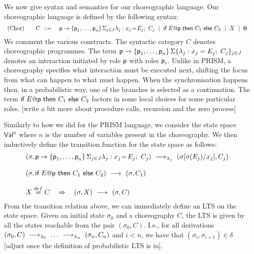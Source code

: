 We now give syntax and semantics for our choreographic language.
%
 Our choreographic language is defined by the following
syntax:
%
\begin{displaymath}
  \begin{array}{lll}
    \text{(Chor)}
    \quad & C \ ::=\
    &
      \textsf{p}\rightarrow \{\textsf{p}_1,\ldots,\textsf{p}_n\}\,\Sigma_{j\in J} \lambda_j: x_j\!=\!E_j;\ C_j
      \ \mid\
      \textsf{if } E@\textsf{p} \textsf{ then } {C_1} \textsf{ else } {C_2}
      \ \mid\
      X
      \ \mid\
      \mathbf{0}
  \end{array}
\end{displaymath}
We comment the various constructs. The syntactic category $C$ denotes
choreographic programmes. The term
$\textsf{p}\rightarrow \{\textsf{p}_1,\ldots,\textsf{p}_n\}\,\Sigma\{\lambda_j:
x_j=E_j;\ C_j\}_{j\in J}$ denotes an interaction initiated by role
$\textsf{p}$ with roles $\textsf{p}_i$. Unlike in PRISM, a choreography
specifies what interaction must be executed next, shifting the focus
from what can happen to what must happen. When the synchronisation
happens then, in a probabilistic way, one of the branches is selected
as a continuation. The term
$\textsf{if } E@\textsf{p} \textsf{ then } C_1 \textsf{
  else } C_2$ factors in some local choices for some particular
roles. [write a bit more about procedure calls, recursion and the zero
process]

\mypar{Semantics.} Similarly to how we did for the PRISM language, we
consider the state space $\mathsf{Val}^n$ where $n$ is the number of
variables present in the choreography. We then inductively define the
transition function for the state space as follows: 
\begin{displaymath}
  \begin{array}{lllll}
    (\sigma, \interact{p}{\role p_1,\ldots,\role p_n}) 
    \red{\lambda_j}
    (\sigma[\sigma(E_j)/x_j], C_j) 
    \\\\
    (\sigma,\ifTE {E}{p}{C_1}{C_2}) 
    \red{}
    (\sigma, C_1)
    \\\\
    X\stackrel{\mathsf{def}}{=} C \quad\Rightarrow\quad (\sigma, X) \red{}(\sigma,C)
  \end{array}
\end{displaymath}
From the transition relation above, we can immediately define an LTS
on the state space. Given an initial state $\sigma_0$ and a
choreography $C$, the LTS is given by all the states reachable from
the pair $(\sigma_0,C)$. I.e., for all derivations
$(\sigma_0,C)\ \longrightarrow_{\lambda_0}\ \ldots\ \longrightarrow_{\lambda_n}\ (\sigma_n, C_n)$ and
$i<n$, we have that $(\sigma_i,\sigma_{i+1})\in\delta$ [adjust once
the definition of probabilistic LTS is in].




